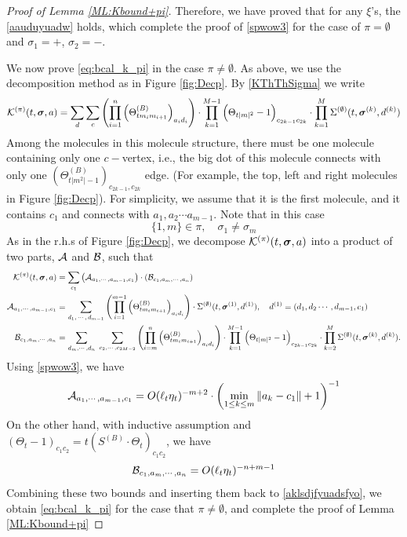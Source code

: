 \documentclass[10pt,reqno]{article}
\theoremstyle{plain} %
\theoremstyle{remark}
\numberwithin{equation}{section}
\begin{document}
\begin{proof}[Proof of Lemma  \ref{ML:Kbound+pi}]
Therefore, we have proved that for any $\xi$'s, the \eqref{aauduyuadw} holds, which complete the proof of \eqref{spwow3} for the case of $\pi=\emptyset$ and $\sigma_1=+$, $\sigma_2=-$. 

\bigskip

We  now prove  \eqref{eq:bcal_k_pi} in the case $\pi\ne \emptyset$. As above, we use the decomposition method as in Figure \ref{fig:Decp}.  By \eqref{KThThSigma} we write  \begin{align} 
{\cal K}^{(\pi)}(t, \boldsymbol{\sigma}, \textbf{a})=
\sum_{\textbf{d}}\sum_{\textbf{c}}\left(\prod_{i=1}^{n}\left(\Theta^{(B)}_{tm_im_{i+1}}\right)_{a_id_i}\right)\cdot \prod_{k=1}^{M-1}\Big(\Theta_{{t|m|^2}}-1\Big)_{c_{2k-1}c_{2k}}
\cdot
\prod_{k=1}^{M}{\Sigma}^{(\emptyset)}(t, \boldsymbol{\sigma}^{(k)}, \textbf{d}^{(k)})   \end{align}
Among the molecules in this molecule structure, there must be one molecule containing only  one $c-$vertex, i.e., the big dot of this molecule  connects with only  one  $(\Theta^{(B)}_{t|m^2|-1})  _{c_{2k-1},c_{2k}}$ edge. (For example, the top, left and right molecules in Figure \ref{fig:Decp}). For simplicity, we assume that it is the first molecule, and it contains $c_1$ and  connects with $a_1,a_2\cdots a_{m-1}$. Note that in this case 
\begin{equation} \label{jjshsaa}
\{1,m \}\in \pi, \quad \sigma_1\ne \sigma_{m }
\end{equation}
As in the r.h.s of Figure \ref{fig:Decp}, we decompose  ${\cal K}^{(\pi)}(t, \boldsymbol{\sigma}, \textbf{a})$ into a  product of two parts,  ${\cal A}$ and ${\cal B}$, such that 
\begin{align} \label{aklsdjfyuadsfyo}
{\cal K}^{(\pi)}(t, \boldsymbol{\sigma}, \textbf{a})
& =
\sum_{c_1} \left({\cal A}_{a_1,\cdots,a_{m-1},c_1}\right)\cdot \left({\cal B}_{c_1, a_m,\cdots,a_{n}}\right)
\\\nonumber
{\cal A}_{a_1,\cdots,a_{m-1},c_1}& =\sum_{d_1,\,\cdots,\,d_{m-1}} \left(\prod_{i=1}^{m-1}\left(\Theta^{(B)}_{tm_im_{i+1}}\right)_{a_id_i}\right)
\cdot
 {\Sigma}^{(\emptyset)}(t, \boldsymbol{\sigma}^{(1)}, \textbf{d}^{(1)}),
 \quad  \textbf{d}^{(1)}  =(d_1, d_2\cdots, d_{m-1}, c_1)  
\\\nonumber
 {\cal B}_{c_1, a_m,\cdots,a_{n}} &=\sum_{d_m,\cdots,d_n}\; \sum_{c_2,\cdots,c_{2M-2}}\left(\prod_{i=m}^{n}\left(\Theta^{(B)}_{tm_im_{i+1}}\right)_{a_id_i}\right)\cdot \prod_{k=1}^{M-1}\Big(\Theta_{{t|m|^2}}-1\Big)_{c_{2k-1}c_{2k}}
\cdot
 \prod_{k=2}^{M}{\Sigma}^{(\emptyset)}(t, \boldsymbol{\sigma}^{(k)}, \textbf{d}^{(k)}). 
\end{align}
Using \eqref{spwow3}, we have 
$$
 {\cal A}_{a_1,\cdots,a_{m-1},c_1}=O(\ell_t\eta_t)^{-m+2}\cdot \left(\min_{1\le k\le m} \|a_k-c_1\|+1\right)^{-1}
$$
On the other hand, with inductive assumption and $(\Theta_t-1)_{c_1c_2}=t\left(S^{(B)}\cdot \Theta_t\right)_{c_1c_2}$,   we have 
$$
{\cal B}_{c_1, a_m,\cdots,a_{n}}=O(\ell_t\eta_t)^{-n+m-1}
$$
Combining  these two bounds and inserting  them back to \eqref{aklsdjfyuadsfyo}, we obtain \eqref{eq:bcal_k_pi} for the case that $\pi\ne \emptyset$, and complete the proof of Lemma  \ref{ML:Kbound+pi}


\end{proof}
\end{document}
